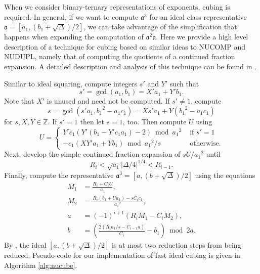 \documentclass{ucalgthes1}
\theoremstyle{definition}
\newcommand{\ZZ}{\mathbb{Z}}
\begin{document}
When we consider binary-ternary representations of exponents, cubing is required.  In general, if we want to compute ${\mathfrak a}^3$ for an ideal class representative $\mathfrak a = [a_1, (b_1+\sqrt\Delta)/2]$, we can take advantage of the simplification that happens when expanding the computation of ${\mathfrak a}^2 \mathfrak a$.  Here we provide a high level description of a technique for cubing based on similar ideas to NUCOMP and NUDUPL, namely that of computing the quotients of a continued fraction expansion.  A detailed description and analysis of this technique can be found in \cite{Imbert2010}.

Similar to ideal squaring, compute integers $s'$ and $Y'$ such that
\[
s' = \gcd(a_1, b_1) = X'a_1 + Y'b_1.
\]
Note that $X'$ is unused and need not be computed.  If $s' \neq 1$, compute
\[
s = \gcd(s'a_1, {b_1}^2 - a_1c_1) = Xs'a_1 + Y({b_1}^2 - a_1c_1)
\]
for $s, X, Y \in \ZZ$.  If $s' = 1$ then let $s = 1$, too.  Then compute $U$ using
\[
U = \begin{cases}
		Y'c_1(Y'(b_1 - Y'c_1a_1) - 2) \bmod {a_1}^2 & \textrm{ if } s' = 1 \\
		-c_1(XY'a_1+Yb_1) \bmod {a_1}^2/s & \textrm{ otherwise.}
    \end{cases}
\]
Next, develop the simple continued fraction expansion of $sU/{a_1}^2$ until
\[
	R_i < \sqrt{a_1}|\Delta/4|^{1/4} < R_{i-1}.
\]
Finally, compute the representative $\mathfrak a^3 = [a, (b + \sqrt\Delta)/2]$ using the equations
\begin{align*}
	M_1 &= \frac{R_i + C_i U}{a_1}, \\
	M_2 &= \frac{R_i(b_1 + Ua_1) - sC_ic_1}{{a_1}^2}, \\
	a &= (-1)^{i+1} (R_i M_1 - C_i M_2), \\
	b &= \left( \frac{2(R_ia_1/s - C_{i-1}a)}{C_i} - b_1 \right) \bmod 2a.
\end{align*}
By \cite[p.15~Theorem~5.1]{Imbert2010}, the ideal $[a, (b + \sqrt\Delta)/2]$ is at most two reduction steps from being reduced.  Pseudo-code for our implementation of fast ideal cubing is given in Algorithm \ref{alg:nucube}.
\end{document}
